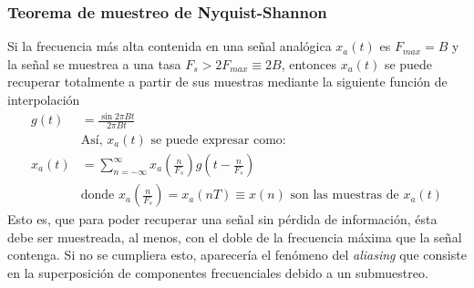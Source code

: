 \subsubsection{Teorema de muestreo de Nyquist-Shannon}\label{subsec: nyquist}
Si la frecuencia más alta contenida en una señal analógica $x_{a}(t)$ es $F_{max}=B$ y la señal se muestrea a una tasa $F_{s}>2F_{max}\equiv 2B$, entonces $x_{a}(t)$ se puede recuperar totalmente a partir de sus muestras mediante la siguiente función de interpolación
\begin{align}
	g(t)&=\frac{\sin 2\pi Bt}{2\pi Bt} \\ \nonumber
	&\text{Así, }x_{a}(t)\text{ se puede expresar como:} \\ \nonumber
	x_{a}(t)&=\sum _{n=-\infty }^{\infty }x_{a}\left({\frac {n}{F_{s}}}\right)g\left(t-{\frac {n}{F_{s}}}\right)\\ \nonumber
	&\text{donde }x_{a}\left({\frac {n}{F_{s}}}\right)=x_{a}\left(nT\right)\equiv x\left(n\right)\text{ son las muestras de }x_{a}\left(t\right)
\end{align}
Esto es, que para poder recuperar una señal sin pérdida de información, ésta debe ser muestreada, al menos, con el doble de la frecuencia máxima que la señal contenga. Si no se cumpliera esto, aparecería el fenómeno del \textit{aliasing} que consiste en la superposición de componentes frecuenciales debido a un submuestreo.
